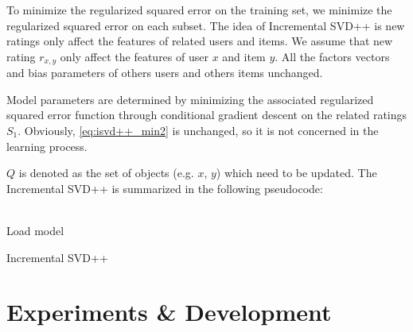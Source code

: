 \documentclass[oneside,13pt]{extreport}
\begin{document}
To minimize the regularized squared error on the training set, we minimize the regularized squared error on each subset. The idea of Incremental SVD++ is new ratings only affect the features of related users and items. We assume that new rating $r_{x,y}$ only affect the features of user $x$ and item $y$. All the factors vectors and bias parameters of others users and others items unchanged.  

Model parameters are determined by minimizing the associated regularized squared error function through conditional gradient descent on the related ratings $S_1$. Obviously, \ref{eq:isvd++_min2} is unchanged, so it is not concerned in the learning process. 

$Q$ is denoted as the set of objects (e.g. $x$, $y$) which need to be updated. The Incremental SVD++ is summarized in the following pseudocode:
\\\\

\begin{algorithm}[H]
 Load model\;
 \caption{Incremental SVD++}
\end{algorithm}


\chapter{Experiments \& Development}
\label{experiments}
\end{document}
